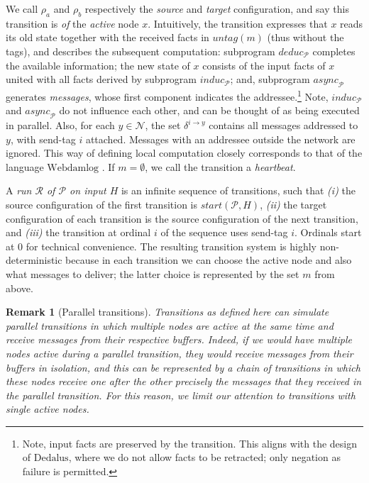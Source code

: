 \documentclass{tlp}
\newtheorem{remark}{Remark}
\newcommand{\langname}[1]{\text{#1}}  \newcommand{\pred}[1]{\mathtt{#1}}  \newcommand{\fname}[1]{\mathit{#1}}  \newcommand{\sq}[1]{`{#1}'}
\newcommand{\dedalus}{\langname{Dedalus}}
\newcommand{\webdamlog}{\langname{Webdamlog}}
\newcommand{\ded}{\mathcal{P}}
\newcommand{\nw}{\mathcal{N}}
\newcommand{\cnf}{\rho}
\newcommand{\cnfstart}[2]{\fname{\fname{start}}(#1,#2)}
\newcommand{\run}{\mathcal{R}}
\newcommand{\untag}[1]{\fname{untag}(#1)}
\newcommand{\sendto}[2]{\delta^{#1\to#2}}
\newcommand{\deduc}[1]{\fname{deduc}_{#1}}
\newcommand{\induc}[1]{\fname{induc}_{#1}}
\newcommand{\async}[1]{\fname{async}_{#1}}
\begin{document}
We call $\cnf_{a}$ and $\cnf_{b}$ respectively the \emph{source}
and \emph{target} configuration, and say this transition is \emph{of}
the \emph{active} node $x$. Intuitively, the transition expresses
that $x$ reads its old state together with the received facts in
$\untag m$ (thus without the tags), and describes the subsequent
computation: subprogram $\deduc{\ded}$ completes the available information;
the new state of $x$ consists of the input facts of $x$ united with
all facts derived by subprogram $\induc{\ded}$; and, subprogram $\async{\ded}$
generates \emph{messages}, whose first component indicates the addressee.\footnote{Note, input facts are preserved by the transition. This aligns with
the design of $\dedalus$, where we do not allow facts to be retracted;
only negation as failure is permitted.} Note, $\induc{\ded}$ and $\async{\ded}$ do not influence each other,
and can be thought of as being executed in parallel. Also, for each
$y\in\nw$, the set $\sendto iy$ contains all messages addressed
to $y$, with send-tag $i$ attached. Messages with an addressee outside
the network are ignored. This way of defining local computation closely
corresponds to that of the language $\webdamlog$ \cite{webdamlog}.
If $m=\emptyset$, we call the transition a \emph{heartbeat}.



A \emph{run $\run$ of $\ded$ on input $H$} is an infinite sequence
of transitions, such that \emph{(i)} the source configuration of
the first transition is $\cnfstart{\ded}H$, \emph{(ii)} the target
configuration of each transition is the source configuration of the
next transition, and \emph{(iii)} the transition at ordinal $i$
of the sequence uses send-tag $i$. Ordinals start at $0$ for technical
convenience. The resulting transition system is highly non-deterministic
because in each transition we can choose the active node and also
what messages to deliver; the latter choice is represented by the
set $m$ from above.





\begin{remark}[Parallel transitions]Transitions as defined here can
simulate \emph{parallel} transitions in which multiple nodes are
active at the same time and receive messages from their respective
buffers. Indeed, if we would have multiple nodes active during a parallel
transition, they would receive messages from their buffers in isolation,
and this can be represented by a chain of transitions in which these
nodes receive one after the other precisely the messages that they
received in the parallel transition. For this reason, we limit our
attention to transitions with single active nodes.\end{remark}
\end{document}
